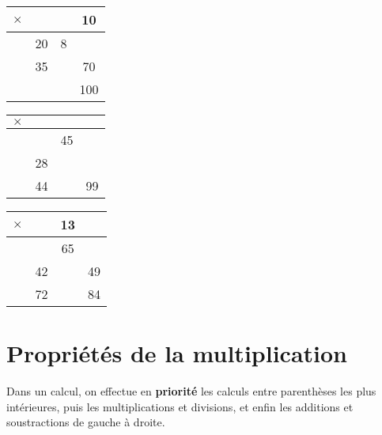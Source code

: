 \begin{activite}
\begin{QCM}
{    \medskip
      \hfill
      \begin{tabular}{|C{0.5}||C{0.5}|C{0.5}|C{0.5}|}
         \hline
         {\Large $\times$} & & & 10 \\
         \hline\hline
         & 20 & 8 & \\
         \hline
         & 35 & & 70 \\
         \hline
         & & & 100 \\
         \hline
      \end{tabular}
      \hfill
      \begin{tabular}{|C{0.5}||C{0.5}|C{0.5}|C{0.5}|}
         \hline
         {\Large $\times$} & & & \\
         \hline\hline
         & & 45 & \\
         \hline
         & 28 & & \\
         \hline
         & 44 & & 99 \\
         \hline
      \end{tabular}
      \hfill
      \begin{tabular}{|C{0.5}||C{0.5}|C{0.5}|C{0.5}|}
         \hline
         {\Large $\times$} & & 13 & \\
         \hline\hline
         & & 65 & \\
         \hline
         & 42 & & 49 \\
         \hline
         & 72 & & 84 \\
         \hline
      \end{tabular}}
      \hspace*{1cm}
      \vspace*{1cm}
   \end{QCM}
\end{activite}
 

\cours 

\section{Propriétés de la multiplication}

\begin{propriete}
   Dans un calcul, on effectue en {\bf priorité} les calculs entre parenthèses les plus intérieures, puis les multiplications et divisions, et enfin les additions et soustractions de gauche à droite.
\end{propriete}

